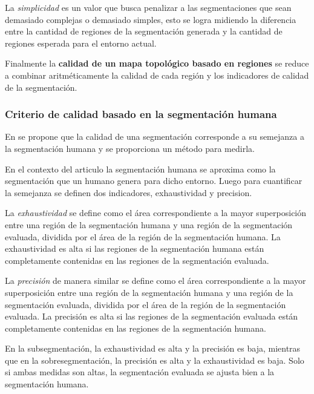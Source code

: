 
La \emph{simplicidad} es un valor que busca penalizar a las segmentaciones que
sean demasiado complejas o demasiado simples, esto se logra midiendo la
diferencia entre la cantidad de regiones de la segmentación generada y la 
cantidad de regiones esperada para el entorno actual.

Finalmente la \textbf{calidad de un mapa topológico basado en regiones} se
reduce a combinar aritméticamente la calidad de cada región y los indicadores
de calidad de la segmentación.


\subsubsection{Criterio de calidad basado en la segmentación humana}
En \cite{bormann2016room} se propone que la calidad de una segmentación
corresponde a su semejanza a la segmentación humana y se proporciona un método
para medirla.  

En el contexto del articulo la segmentación humana se aproxima como la
segmentación que un humano genera para dicho entorno. Luego para cuantificar la
semejanza se definen dos indicadores, exhaustividad y precision. 

La \emph{exhaustividad} se define como el área correspondiente a la mayor 
superposición entre una región de la segmentación humana y una región de la
segmentación evaluada, dividida por el área de la región de la segmentación
humana. La exhaustividad es alta si las regiones de la segmentación humana
están completamente contenidas en las regiones de la segmentación evaluada. 

La \emph{precisión} de manera similar se define como el área correspondiente a
la mayor superposición entre una región de la segmentación humana y una región
de la segmentación evaluada, dividida por el área de la región de la
segmentación evaluada. La precisión es alta si las regiones de la segmentación
evaluada están completamente contenidas en las regiones de la segmentación
humana. 

En la subsegmentación, la exhaustividad es alta y la precisión es baja,
mientras que en la sobresegmentación, la precisión es alta y la exhaustividad
es baja.  Solo si ambas medidas son altas, la segmentación evaluada se ajusta
bien a la segmentación humana.  

